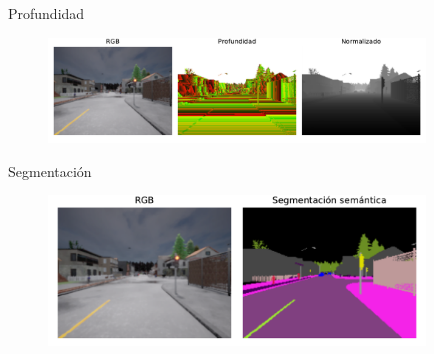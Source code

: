 \documentclass[10pt, usepdftitle=false]{beamer}
\begin{document}
\begin{frame}[fragile]{Profundidad}
	\begin{figure}[H]
		\captionsetup{labelformat=empty}
		\centering
		\includegraphics[width=10cm]{imagenes/depth}
	\end{figure}
\end{frame}

\begin{frame}[fragile]{Segmentación}
	\begin{figure}[H]
		\captionsetup{labelformat=empty}
		\centering
		\includegraphics[width=10cm]{imagenes/semseg}
	\end{figure}
\end{frame}
\end{document}
